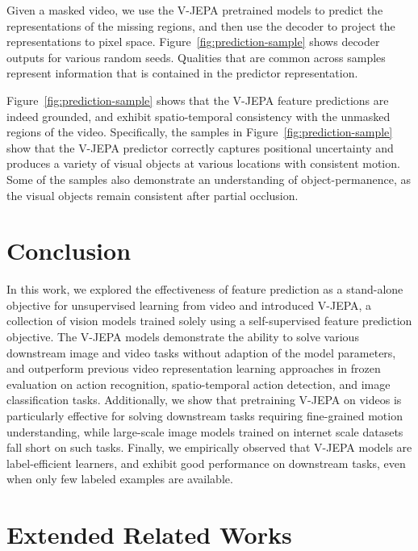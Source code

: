 \documentclass[twocolumn]{fairmeta}
\newcommand{\putalg}{{\small V-JEPA}\xspace}
\theoremstyle{plain}
\theoremstyle{definition}
\theoremstyle{remark}
\begin{document}
Given a masked video, we use the \putalg pretrained models to predict the representations of the missing regions, and then use the decoder to project the representations to pixel space. Figure~\ref{fig:prediction-sample} shows decoder outputs for various random seeds.
Qualities that are common across samples represent information that is contained in the predictor representation.

Figure~\ref{fig:prediction-sample} shows that the \putalg feature predictions are indeed grounded, and exhibit spatio-temporal consistency with the unmasked regions of the video.
Specifically, the samples in Figure~\ref{fig:prediction-sample} show that the \putalg predictor correctly captures positional uncertainty and produces a variety of visual objects at various locations with consistent motion.
Some of the samples also demonstrate an understanding of object-permanence, as the visual objects remain consistent after partial occlusion.


\section{Conclusion}
In this work, we explored the effectiveness of feature prediction as a stand-alone objective for unsupervised learning from video and introduced \putalg, a collection of vision models trained solely using a self-supervised feature prediction objective.
The \putalg models demonstrate the ability to solve various downstream image and video tasks without adaption of the model parameters, and outperform previous video representation learning approaches in frozen evaluation on action recognition, spatio-temporal action detection, and image classification tasks.
Additionally, we show that pretraining \putalg on videos is particularly effective for solving downstream tasks requiring fine-grained motion understanding, while large-scale image models trained on internet scale datasets fall short on such tasks.
Finally, we empirically observed that \putalg models are label-efficient learners, and exhibit good performance on downstream tasks, even when only few labeled examples are available.




\clearpage
\newpage

\onecolumn

\beginappendix


\section{Extended Related Works}
\end{document}
